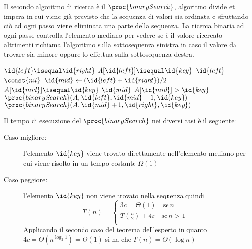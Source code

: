 Il secondo algoritmo di ricerca è il $\proc{binarySearch}$, algoritmo divide et impera
in cui viene già previsto che la sequenza di valori sia ordinata e sfruttando ciò
ad ogni passo viene eliminata una parte della sequenza.\newline
La ricerca binaria ad ogni passo controlla l'elemento mediano per vedere se è il valore
ricercato altrimenti richiama l'algoritmo sulla sottosequenza sinistra in caso il valore
da trovare sia minore oppure lo effettua sulla sottosequenza destra.

\begin{codebox}
\li \If $\id{left} \isequal \id{right}$
    \Then
\li                \If $A[\id{left}] \isequal \id{key}$
                   \Then
\li                            \Return $\id{left}$
\li                \Else \Return $\const{nil}$
    \End
\li \Else
\li                $\id{mid} \gets (\id{left} + \id{right}) / 2$
\li                \If $A[\id{mid}] \isequal \id{key}$
\li                   \Then \Return $\id{mid}$
                   \End
\li                \If $A[\id{mid}] > \id{key}$
                   \Then
\li                          \Return $\proc{binarySearch}(A,\id{left},\id{mid}-1,\id{key})$
\li                \Else \Return $\proc{binarySearch}(A,\id{mid}+1,\id{right},\id{key})$
    \End
\end{codebox}

Il tempo di esecuzione del $\proc{binarySearch}$ nei diversi casi è il seguente:
\begin{description}
  \item[Caso migliore:] l'elemento $\id{key}$ viene trovato direttamente nell'elemento mediano
        per cui viene risolto in un tempo costante $\Omega(1)$
  \item[Caso peggiore:] l'elemento $\id{key}$ non viene trovato nella sequenza quindi
        \begin{equation*}
           T(n) = \begin{cases} 3c = \Theta(1) \quad \text{se} \ n = 1 \\
                                T(\frac{n}{2}) + 4c \quad \text{se} \ n > 1\\
                  \end{cases}
        \end{equation*}
        Applicando il secondo caso del teorema dell'esperto in quanto $4c = \Theta(n^{\log _2 1}) = \Theta(1)$
        si ha che $T(n) = \Theta(\log n)$
\end{description}
